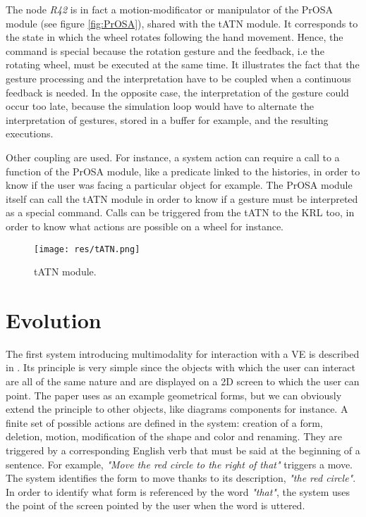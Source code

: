\documentclass[a4paper]{article}
\begin{document}
The node \textit{R42} is in fact a motion-modificator or manipulator of the PrOSA module (see figure \ref{fig:PrOSA}), shared with the tATN module. It corresponds to the state in which the wheel rotates following the hand movement. Hence, the command is special because the rotation gesture and the feedback, i.e the rotating wheel, must be executed at the same time. It illustrates the fact that the gesture processing and the interpretation have to be coupled when a continuous feedback is needed. In the opposite case, the interpretation of the gesture could occur too late, because the simulation loop would have to alternate the interpretation of gestures, stored in a buffer for example, and the resulting executions.

Other coupling are used. For instance, a system action can require a call to a function of the PrOSA module, like a predicate linked to the histories, in order to know if the user was facing a particular object for example. The PrOSA module itself can call the tATN module in order to know if a gesture must be interpreted as a special command. Calls can be triggered from the tATN to the KRL too, in order to know what actions are possible on a wheel for instance.

\begin{figure}
\centering
\texttt{[image: res/tATN.png]}
\caption{\label{fig:tATN}tATN module.}
\end{figure}

\section{Evolution}
\label{sec:evolution}
The first system introducing multimodality for interaction with a VE is described in \cite{putthatthere}. Its principle is very simple since the objects with which the user can interact are all of the same nature and are displayed on a 2D screen to which the user can point. The paper uses as an example geometrical forms, but we can obviously extend the principle to other objects, like diagrams components for instance. A finite set of possible actions are defined in the system: creation of a form, deletion, motion, modification of the shape and color and renaming. They are triggered by a corresponding English verb that must be said at the beginning of a sentence. For example, \textit{"Move the red circle to the right of that"} triggers a move. The system identifies the form to move thanks to its description, \textit{"the red circle"}. In order to identify what form is referenced by the word \textit{"that"}, the system uses the point of the screen pointed by the user when the word is uttered.
\end{document}
